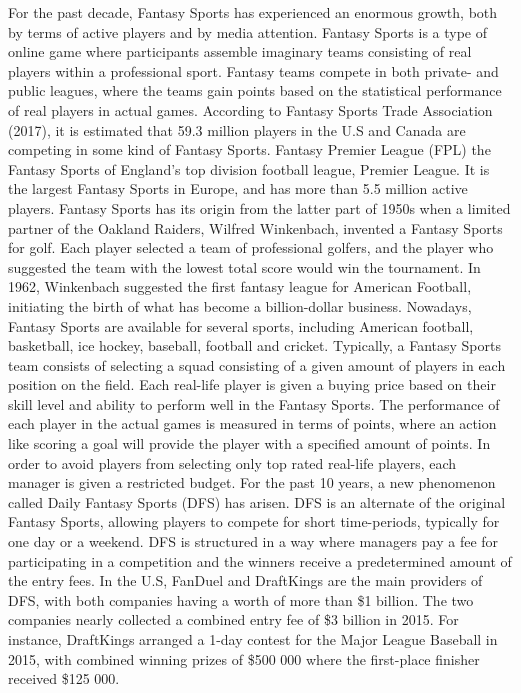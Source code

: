 For the past decade, Fantasy Sports has experienced an enormous growth, both by terms of active players and by media attention. Fantasy Sports is a type of online game where participants assemble imaginary teams consisting of real players within a professional sport. Fantasy teams compete in both private- and public leagues, where the teams gain points based on the statistical performance of real players in actual games. According to Fantasy Sports Trade Association (2017), it is estimated that 59.3 million players in the U.S and Canada are competing in some kind of Fantasy Sports. Fantasy Premier League (FPL) the Fantasy Sports of England's top division football league, Premier League. It is the largest Fantasy Sports in Europe, and has more than 5.5 million active players. 
\newpar
Fantasy Sports has its origin from the latter part of 1950s when a limited partner of the Oakland Raiders, Wilfred Winkenbach, invented a Fantasy Sports for golf. Each player selected a team of professional golfers, and the player who suggested the team with the lowest total score would win the tournament. In 1962, Winkenbach suggested the first fantasy league for American Football, initiating the birth of what has become a billion-dollar business. Nowadays, Fantasy Sports are available for several sports, including American football, basketball, ice hockey, baseball, football and cricket.  
\newpar
Typically, a Fantasy Sports team consists of selecting a squad consisting of a given amount of players in each position on the field. Each real-life player is given a buying price based on their skill level and ability to perform well in the Fantasy Sports. The performance of each player in the actual games is measured in terms of points, where an action like scoring a goal will provide the player with a specified amount of points. In order to avoid players from selecting only top rated real-life players, each manager is given a restricted budget. 
\newpar
For the past 10 years, a new phenomenon called Daily Fantasy Sports (DFS) has arisen. DFS is an alternate of the original Fantasy Sports, allowing players to compete for short time-periods, typically for one day or a weekend. DFS is structured in a way where managers pay a fee for participating in a competition and the winners receive a predetermined amount of the entry fees. In the U.S, FanDuel and DraftKings are the main providers of DFS, with both companies having a worth of more than \$1 billion. The two companies nearly collected a combined entry fee of \$3 billion in 2015. For instance, DraftKings arranged a 1-day contest for the Major League Baseball in 2015, with combined winning prizes of \$500 000 where the first-place finisher received \$125 000. 

